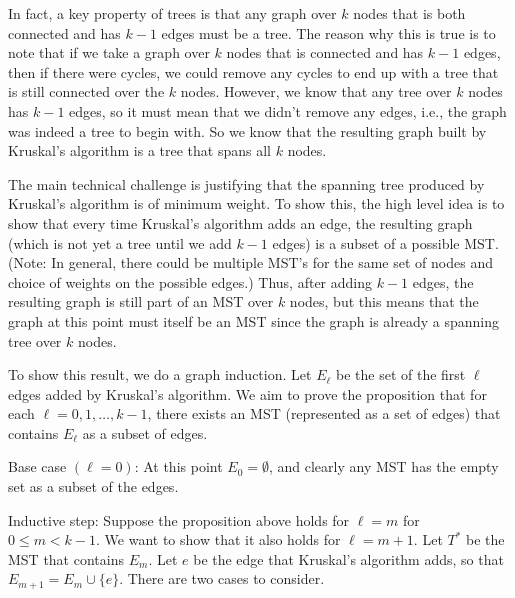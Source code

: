 In fact, a key property of trees is that any graph over $k$ nodes that is both connected and has $k-1$ edges must be a tree. The reason why this is true is to note that if we take a graph over $k$ nodes that is connected and has $k-1$ edges, then if there were cycles, we could remove any cycles to end up with a tree that is still connected over the $k$ nodes. However, we know that any tree over $k$ nodes has $k-1$ edges, so it must mean that we didn't remove any edges, i.e., the graph was indeed a tree to begin with. So we know that the resulting graph built by Kruskal's algorithm is a tree that spans all $k$ nodes.

The main technical challenge is justifying that the spanning tree produced by Kruskal's algorithm is of minimum weight. To show this, the high level idea is to show that every time Kruskal's algorithm adds an edge, the resulting graph (which is not yet a tree until we add $k-1$ edges) is a subset of a possible MST. (Note: In general, there could be multiple MST's for the same set of nodes and choice of weights on the possible edges.) Thus, after adding $k-1$ edges, the resulting graph is still part of an MST over $k$ nodes, but this means that the graph at this point must itself be an MST since the graph is already a spanning tree over $k$ nodes.

To show this result, we do a graph induction. Let $E_{\ell }$ be the set of the first $\ell$ edges added by Kruskal's algorithm. We aim to prove the proposition that for each $\ell =0,1,\dots ,k-1$, there exists an MST (represented as a set of edges) that contains $E_{\ell }$ as a subset of edges.

Base case $(\ell=0)$: At this point $E_0 =\emptyset$, and clearly any MST has the empty set as a subset of the edges.

Inductive step: Suppose the proposition above holds for $\ell =m$ for $0\le m<k-1$. We want to show that it also holds for $\ell=m+1$. Let $T^{*}$ be the MST that contains $E_m$. Let $e$ be the edge that Kruskal's algorithm adds, so that $E_{m+1}=E_{m}\cup \{ e\}$. There are two cases to consider.

